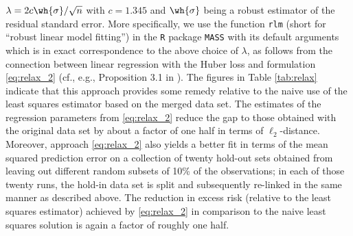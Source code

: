 \documentclass[11pt]{article}
\begin{document}
$\lambda = 2 c \wh{\sigma} / \sqrt{n}$ with $c = 1.345$ and $\wh{\sigma}$ being a robust estimator of the residual standard error. More specifically, we use the function \texttt{rlm} (short for ``robust linear model fitting'') in the \texttt{R} package \texttt{MASS} \cite{MASS} with its default arguments which is in exact correspondence to the above choice of $\lambda$, as follows from the connection between linear regression with the Huber loss and formulation \eqref{eq:relax_2} (cf., e.g., Proposition 3.1 in \cite{She2012}). The figures 
in Table \ref{tab:relax} indicate that this approach provides some remedy relative to the naive use of the least squares estimator based on the merged data set. The estimates of the regression parameters from \eqref{eq:relax_2} reduce the gap to those obtained with the original data set by about a factor of one half in terms of $\ell_2$-distance. Moreover, approach \eqref{eq:relax_2} also yields a better fit in terms of the mean squared prediction error on a collection of twenty hold-out sets obtained from leaving out different random subsets of 10\% of the observations; in each of those twenty runs, the hold-in data set is split and subsequently re-linked in the same manner as described above. The reduction in excess risk (relative to the least squares estimator) achieved by \eqref{eq:relax_2} in comparison to the naive least squares solution is again a factor of roughly one half.  
 

\end{document}
